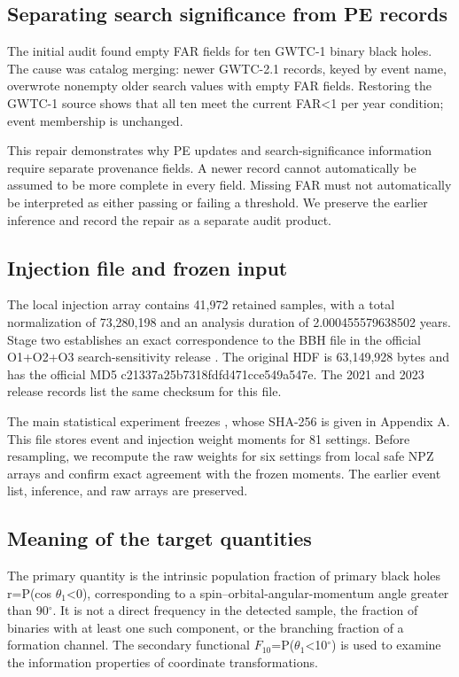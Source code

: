 \documentclass[a4paper,11pt]{article}
\begin{document}
\subsection{Separating search significance from PE records}\label{sec:2.2}
The initial audit found empty FAR fields for ten GWTC-1 binary black holes. The cause was catalog merging: newer GWTC-2.1 records, keyed by event name, overwrote nonempty older search values with empty FAR fields. Restoring the GWTC-1 source shows that all ten meet the current FAR<1 per year condition; event membership is unchanged.

This repair demonstrates why PE updates and search-significance information require separate provenance fields. A newer record cannot automatically be assumed to be more complete in every field. Missing FAR must not automatically be interpreted as either passing or failing a threshold. We preserve the earlier inference and record the repair as a separate audit product.

\subsection{Injection file and frozen input}\label{sec:2.3}
The local injection array contains 41,972 retained samples, with a total normalization of 73,280,198 and an analysis duration of 2.000455579638502 years. Stage two establishes an exact correspondence to the BBH file in the official O1+O2+O3 search-sensitivity release \cite{ref8}. The original HDF is 63,149,928 bytes and has the official MD5 c21337a25b7318fdfd471cce549a547e. The 2021 and 2023 release records list the same checksum for this file.

The main statistical experiment freezes , whose SHA-256 is given in Appendix A. This file stores event and injection weight moments for 81 settings. Before resampling, we recompute the raw weights for six settings from local safe NPZ arrays and confirm exact agreement with the frozen moments. The earlier event list, inference, and raw arrays are preserved.

\subsection{Meaning of the target quantities}\label{sec:2.4}
The primary quantity is the intrinsic population fraction of primary black holes r=P(cos \(\theta_{1}\)<0), corresponding to a spin–orbital-angular-momentum angle greater than 90\({}^\circ\). It is not a direct frequency in the detected sample, the fraction of binaries with at least one such component, or the branching fraction of a formation channel. The secondary functional \(F_{10}\)=P(\(\theta_{1}\)<10\({}^\circ\)) is used to examine the information properties of coordinate transformations.
\end{document}

